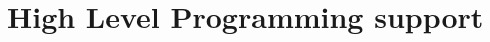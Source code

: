 \documentclass[../main.tex]{subfiles}
\begin{document}
\section{High Level Programming support}
\blindtext
\end{document}
